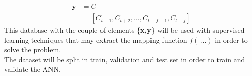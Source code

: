 \begin{equation}
    \begin{aligned}
        \textbf{y} & = C \\
    & = [C_{t+1},C_{t+2}, \dots, C_{t+f-1},C_{t+f}]
    \end{aligned}
\end{equation}
This database with the couple of elements \{\textbf{x,y}\} will be used with supervised learning techniques that may extract the mapping function $f(\,\dots)$ in order to solve the problem. \\

The dataset will be split in train, validation and test set in order to train and validate the \gls{ANN}.



